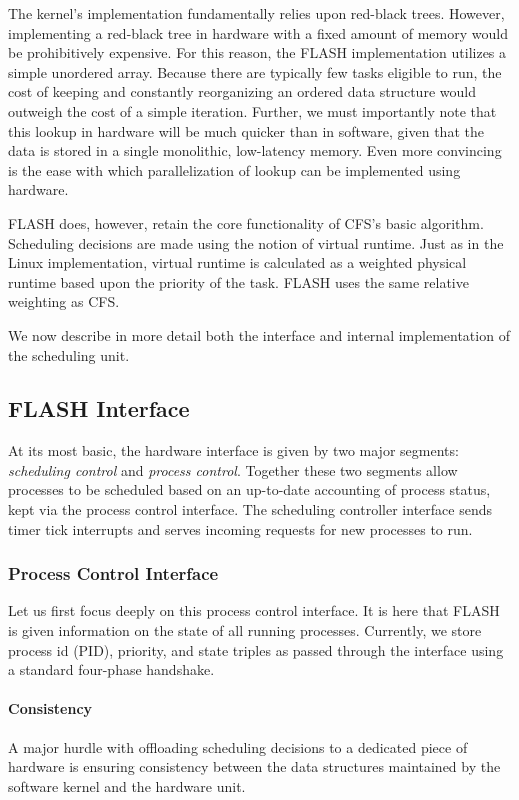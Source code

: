 \documentclass{sig-alternate-10pt}
\begin{document}
The kernel's implementation
fundamentally relies upon red-black trees. However, implementing a red-black tree in hardware with a fixed amount of
memory would be prohibitively expensive.  For this reason, the FLASH
implementation utilizes a simple unordered array.  Because there are
typically few tasks eligible to run, the cost of keeping and constantly reorganizing an
ordered data structure would outweigh the cost of a simple iteration.
Further, we must importantly note that this lookup in hardware will be much
quicker than in software, given that the data is stored in a single
monolithic, low-latency memory.  Even more convincing is the ease with which
parallelization of lookup can be implemented using hardware.

FLASH does, however, retain the core functionality of CFS's basic algorithm.
Scheduling decisions are made using the notion of virtual runtime.   Just as
in the Linux implementation, virtual runtime is calculated as a weighted
physical runtime based upon the priority of the task.  FLASH uses the same
relative weighting as CFS.

We now describe in more detail both the interface and internal
implementation of the scheduling unit.

\subsection{FLASH Interface}
At its most basic, the hardware interface is given by two major segments:
\emph{scheduling control} and \emph{process control}.  Together these two
segments allow processes to be scheduled based on an up-to-date accounting
of process status, kept via the process control interface.  The scheduling
controller interface sends timer tick interrupts and serves incoming
requests for new processes to run.

\subsubsection{Process Control Interface}
Let us first focus deeply on this process control interface.  It is here
that FLASH is given information on the state of all running
processes.  Currently, we store process id (PID), priority, and state
triples as passed through the interface using a standard four-phase
handshake.

\paragraph{Consistency} A major hurdle with offloading scheduling decisions
to a dedicated piece of hardware is ensuring consistency between the data
structures maintained by the software kernel and the
hardware unit.
\end{document}
